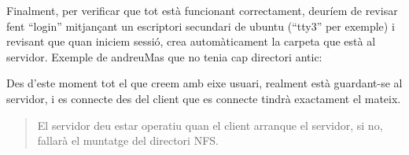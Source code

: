 \documentclass[
  12 pt,
  a4paper,
]{article}
\begin{document}
Finalment, per verificar que tot està funcionant correctament, deuríem
de revisar fent ``login'' mitjançant un escriptori secundari de ubuntu
(``tty3'' per exemple) i revisant que quan iniciem sessió, crea
automàticament la carpeta que està al servidor. Exemple de andreuMas que
no tenia cap directori antic:

Des d'este moment tot el que creem amb eixe usuari, realment està
guardant-se al servidor, i es connecte des del client que es connecte
tindrà exactament el mateix.

\begin{quote}
El servidor deu estar operatiu quan el client arranque el servidor, si
no, fallarà el muntatge del directori NFS.
\end{quote}
\end{document}
